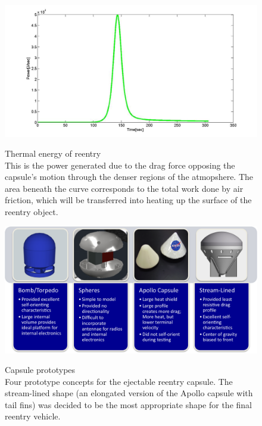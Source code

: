 \documentclass{article}
\begin{document}
\newpage
	\begin{figure}[H]
	\begin{center}
		\includegraphics[width=14cm]{ThermalTransfer}\\
	\end{center}
		\caption{}
		\label{heat}
Thermal energy of reentry\\ \indent This is the power generated due to the drag force opposing the capsule's motion through the denser regions of the atmopshere. The area beneath the curve corresponds to the total work done by air friction, which will be transferred into heating up the surface of the reentry object.
	\end{figure}

	\begin{figure}[H]
	\begin{center}
		\includegraphics[width=14cm]{Prototypes}\\
	\end{center}
		\caption{}
		\label{proto}
Capsule prototypes\\ Four prototype concepts for the ejectable reentry capsule. The stream-lined shape (an elongated version of the Apollo capsule with tail fins) was decided to be the most appropriate shape for the final reentry vehicle.
	\end{figure}
\end{document}
